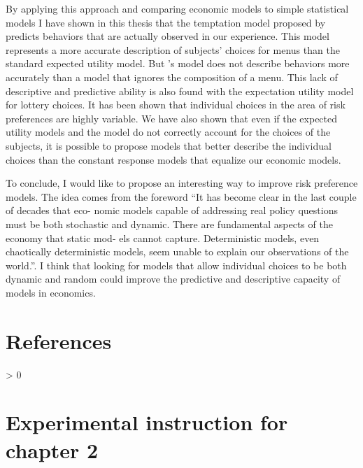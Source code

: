 \documentclass[
]{book}
\newlength{\cslhangindent}
\newenvironment{CSLReferences}[2] %
 {%
  \setlength{\parindent}{0pt}
  \ifodd #1 \everypar{\setlength{\hangindent}{\cslhangindent}}\ignorespaces\fi
  \ifnum #2 > 0
  \setlength{\parskip}{#2\baselineskip}
  \fi
 }%
 {}
\begin{document}
By applying this approach and comparing economic models to simple statistical
models I have shown in this thesis that the temptation model proposed by
\citet{gul2001temptation} predicts behaviors that are actually observed in our
experience.
This model represents a more accurate description of subjects' choices for menus
than the standard expected utility model.
But \citet{gul2001temptation}'s model does not describe behaviors more accurately than
a model that ignores the composition of a menu.
This lack of descriptive and predictive ability is also found with the
expectation utility model for lottery choices.
It has been shown that individual choices in the area of risk preferences are
highly variable.
We have also shown that even if the expected utility models and the
\citet{gul2001temptation} model do not correctly account for the choices of the
subjects, it is possible to propose models that better describe the individual
choices than the constant response models that equalize our economic models.

To conclude, I would like to propose an interesting way to improve risk
preference models.
The idea comes from the foreword \citet{aliprantis2006hitchhiker}
``It has become clear in the last couple of decades that eco-
nomic models capable of addressing real policy questions must be both stochastic
and dynamic. There are fundamental aspects of the economy that static mod-
els cannot capture. Deterministic models, even chaotically deterministic models,
seem unable to explain our observations of the world.''.
I think that looking for models that allow individual choices to be both dynamic
and random could improve the predictive and descriptive capacity of models in
economics.

\hypertarget{references}{%
\chapter*{References}\label{references}}

\hypertarget{refs}{}
\begin{CSLReferences}{0}{0}
\end{CSLReferences}

\hypertarget{appendix-appendix}{%
\appendix}


\hypertarget{expe-instruc2}{%
\chapter{Experimental instruction for chapter 2}\label{expe-instruc2}}
\end{document}
